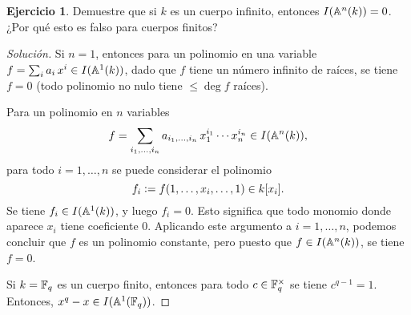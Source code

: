 \documentclass{article}
\theoremstyle{definition}
\newtheorem{ejerc}{Ejercicio}
\newenvironment{solucion}{\begin{proof}[Solución]}{\end{proof}}
\begin{document}
\begin{ejerc}
  Demuestre que si $k$ es un cuerpo infinito, entonces $I (\AA^n (k)) = 0$.
  ¿Por qué esto es falso para cuerpos finitos?

  \ifdefined\solutions\begin{solucion}
    Si $n = 1$, entonces para un polinomio en una variable
    $f = \sum_i a_i\,x^i \in I (\AA^1 (k))$, dado que $f$ tiene un número
    infinito de raíces, se tiene $f = 0$ (todo polinomio no nulo tiene
    $\le \deg f$ raíces).

    Para un polinomio en $n$ variables
    $$f = \sum_{i_1,\ldots,i_n} a_{i_1,\ldots,i_n}\,x_1^{i_1}\cdots x_n^{i_n} \in I (\AA^n (k)),$$
    para todo $i = 1, \ldots, n$ se puede considerar el polinomio
    $$f_i \dfn f (1, \ldots, x_i, \ldots, 1) \in k [x_i].$$
    Se tiene $f_i \in I (\AA^1 (k))$, y luego $f_i = 0$. Esto significa que todo
    monomio donde aparece $x_i$ tiene coeficiente $0$. Aplicando este argumento
    a $i = 1,\ldots,n$, podemos concluir que $f$ es un polinomio constante, pero
    puesto que $f \in I (\AA^n (k))$, se tiene $f = 0$.

    Si $k = \FF_q$ es un cuerpo finito, entonces para todo $c \in \FF_q^\times$
    se tiene $c^{q-1} = 1$. Entonces, $x^q - x \in I (\AA^1 (\FF_q))$.
  \end{solucion}\fi
\end{ejerc}
\end{document}
